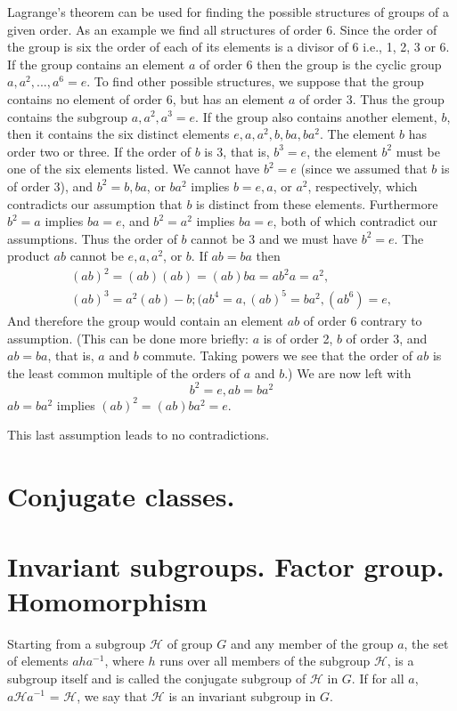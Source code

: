 \documentclass{book}
\begin{document}
Lagrange's theorem can be used for finding the possible structures of
groups of a given order. As an example we find all structures of
order 6. Since the order of the group is six the order of each of its
elements is a divisor of 6 i.e., 1, 2, 3 or 6. If the group contains an element
$a$ of order 6 then the group is the cyclic group $a,a^2,...,a^6 = e$.
To find other possible structures, we suppose that the group
contains no element of order 6, but has an element $a$ of order
3. Thus the group contains the subgroup $a,a^2,a^3 = e$.
If the group also contains another element, $b$, then it contains the
six distinct elements $e,a,a^2,b,ba,ba^2$. The element
$b$ has order two or three. If the order of $b$ is 3, that is, $b^3 = e$,
the element $b^2$ must be one of the six elements listed.
We cannot have $b^2 = e$ (since we assumed that $b$ is of
order 3), and $b^2 = b, ba$, or $ba^2$ implies $b
= e, a$, or $a^2$, respectively, which contradicts our
assumption that $b$ is distinct from these elements. Furthermore
$b^2 = a$ implies $ba = e$, and $b^2 = a^2$ implies $ba = e$,
both of which contradict our assumptions. Thus the order of $b$
cannot be 3 and we must have $b^2 = e$. The product $ab$ cannot
be $e, a, a^2$, or $b$. If $ab = ba$ then
\begin{multline}
(ab)^2 = (ab)(ab) = (ab)ba = ab^2a = a^2, \\
(ab)^3 = a^2(ab) - b; (ab^4 = a, (ab)^5 = ba^2, (ab^6) = e,
\end{multline}
And therefore the group would contain an element $ab$ of order 6
contrary to assumption. (This can be done more briefly: $a$ is of order
2, $b$ of order 3, and $ab = ba$, that is, $a$ and $b$ commute. Taking powers
we see that the order of $ab$ is the least common multiple of the
orders of $a$ and $b$.) We are now left with
$$
b^2 = e, ab = ba^2
$$
$ab = ba^2$ implies $(ab)^2 = (ab)ba^2 = e$.

This last assumption leads to no contradictions.


\section{Conjugate classes.}

\section{Invariant subgroups. Factor group. Homomorphism}

Starting from a subgroup $\mathcal H$ of group $G$ and any member of
the group $a$, the set of elements $aha^{-1}$, where $h$ runs over all
members of the subgroup $\mathcal H$, is a subgroup itself and is
called the conjugate subgroup of $\mathcal H$ in $G$. If for all $a$,
$a{\mathcal H} a^{-1}$ = $\mathcal H$, we say that $\mathcal H$ is an
invariant subgroup in $G$.
\end{document}
